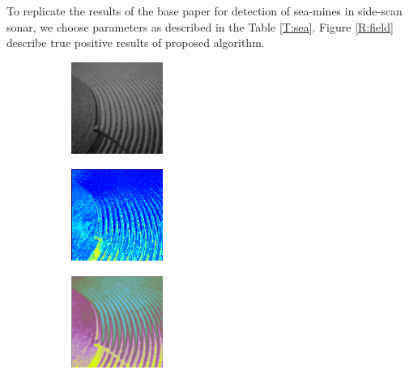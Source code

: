 To replicate the results of the base paper\citep{Gal2013} for detection of sea-mines in side-scan sonar, we choose parameters as described in the Table \ref{T:sea}. Figure \ref{R:field} describe true positive results of proposed algorithm.

 
\begin{figure}[t!] %
\begin{subfigure}{0.32\textwidth}
\includegraphics[height=3cm,width=3cm]{./Figures/field/field.jpg}
\caption{} 
\end{subfigure}\hspace*{\fill}
\begin{subfigure}{0.32\textwidth}
\includegraphics[height=3cm,width=3cm]{./Figures/field/1.png}
\caption{} 
\end{subfigure}
\begin{subfigure}{0.32\textwidth}
\includegraphics[height=3cm,width=3cm]{./Figures/field/2.png}
\caption{} 
\end{subfigure}


\end{figure}
